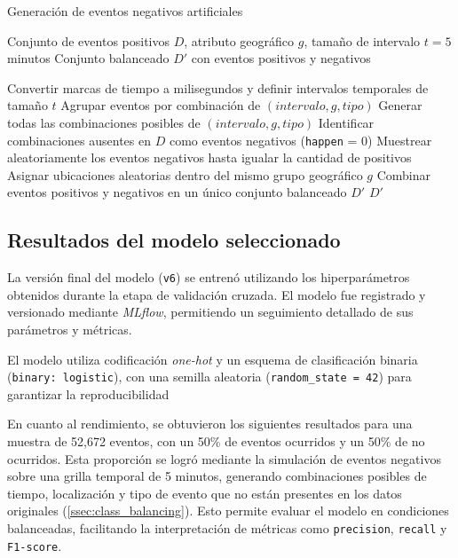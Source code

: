 \documentclass[12pt]{article}
\begin{document}
\begin{algorithm}[H]
\caption{Generación de eventos negativos artificiales}
\label{alg:neg_events}
\begin{algorithmic}[1]
\Require Conjunto de eventos positivos $D$, atributo geográfico $g$, tamaño de intervalo $t = 5$ minutos
\Ensure Conjunto balanceado $D'$ con eventos positivos y negativos

\State Convertir marcas de tiempo a milisegundos y definir intervalos temporales de tamaño $t$
\State Agrupar eventos por combinación de $(intervalo, g, tipo)$
\State Generar todas las combinaciones posibles de $(intervalo, g, tipo)$
\State Identificar combinaciones ausentes en $D$ como eventos negativos (\texttt{happen} = 0)
\State Muestrear aleatoriamente los eventos negativos hasta igualar la cantidad de positivos
\State Asignar ubicaciones aleatorias dentro del mismo grupo geográfico $g$
\State Combinar eventos positivos y negativos en un único conjunto balanceado $D'$
\State \Return $D'$
\end{algorithmic}
\end{algorithm}

\subsection{Resultados del modelo seleccionado}

La versión final del modelo (\texttt{v6}) se entrenó utilizando los hiperparámetros obtenidos durante la etapa de validación cruzada. El modelo fue registrado y versionado mediante \textit{MLflow}, permitiendo un seguimiento detallado de sus parámetros y métricas.

El modelo utiliza codificación \textit{one-hot} y un esquema de clasificación binaria (\texttt{binary: logistic}), con una semilla aleatoria (\texttt{random\_state = 42}) para garantizar la reproducibilidad \parencite{geron2019hands}


\noindent En cuanto al rendimiento, se obtuvieron los siguientes resultados para una muestra de 52,672 eventos, con un 50\% de eventos ocurridos y un 50\% de no ocurridos. Esta proporción se logró mediante la simulación de eventos negativos sobre una grilla temporal de 5 minutos, generando combinaciones posibles de tiempo, localización y tipo de evento que no están presentes en los datos originales (\autoref{ssec:class_balancing}). Esto permite evaluar el modelo en condiciones balanceadas, facilitando la interpretación de métricas como \texttt{precision}, \texttt{recall} y \texttt{F1-score}.
\end{document}
